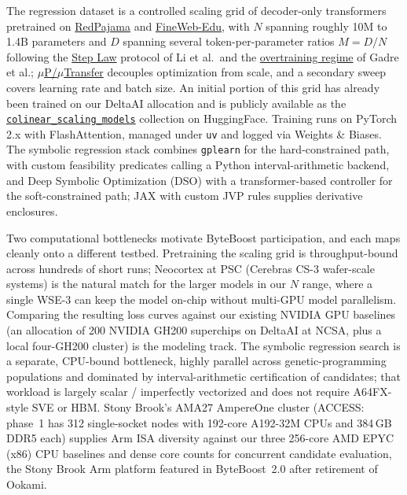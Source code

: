 \documentclass[10pt]{article}
\begin{document}
The regression dataset is a controlled scaling grid of decoder-only transformers pretrained on \href{https://huggingface.co/datasets/togethercomputer/RedPajama-Data-1T}{RedPajama} and \href{https://huggingface.co/datasets/HuggingFaceFW/fineweb-edu}{FineWeb-Edu}, with $N$ spanning roughly 10M to 1.4B parameters and $D$ spanning several token-per-parameter ratios $M = D/N$ following the \href{https://arxiv.org/abs/2503.04715}{Step Law} protocol of Li et al.\ and the \href{https://arxiv.org/abs/2403.08540}{overtraining regime} of Gadre et al.; \href{https://arxiv.org/abs/2203.03466}{$\mu$P/$\mu$Transfer} decouples optimization from scale, and a secondary sweep covers learning rate and batch size. An initial portion of this grid has already been trained on our DeltaAI allocation and is publicly available as the \href{https://huggingface.co/datasets/leibnitz-lab/colinear_scaling_models}{\texttt{colinear\_scaling\_models}} collection on HuggingFace. Training runs on PyTorch 2.x with FlashAttention, managed under \texttt{uv} and logged via Weights \& Biases. The symbolic regression stack combines \texttt{gplearn} for the hard-constrained path, with custom feasibility predicates calling a Python interval-arithmetic backend, and Deep Symbolic Optimization (DSO) with a transformer-based controller for the soft-constrained path; JAX with custom JVP rules supplies derivative enclosures.

Two computational bottlenecks motivate ByteBoost participation, and each maps cleanly onto a different testbed. Pretraining the scaling grid is throughput-bound across hundreds of short runs; Neocortex at PSC (Cerebras CS-3 wafer-scale systems) is the natural match for the larger models in our $N$ range, where a single WSE-3 can keep the model on-chip without multi-GPU model parallelism. Comparing the resulting loss curves against our existing NVIDIA GPU baselines (an allocation of 200 NVIDIA GH200 superchips on DeltaAI at NCSA, plus a local four-GH200 cluster) is the modeling track. The symbolic regression search is a separate, CPU-bound bottleneck, highly parallel across genetic-programming populations and dominated by interval-arithmetic certification of candidates; that workload is largely scalar / imperfectly vectorized and does not require A64FX-style SVE or HBM. Stony Brook's AMA27 AmpereOne cluster (ACCESS: phase~1 has 312 single-socket nodes with 192-core A192-32M CPUs and 384\,GB DDR5 each) supplies Arm ISA diversity against our three 256-core AMD EPYC (x86) CPU baselines and dense core counts for concurrent candidate evaluation, the Stony Brook Arm platform featured in ByteBoost~2.0 after retirement of Ookami.
\end{document}
